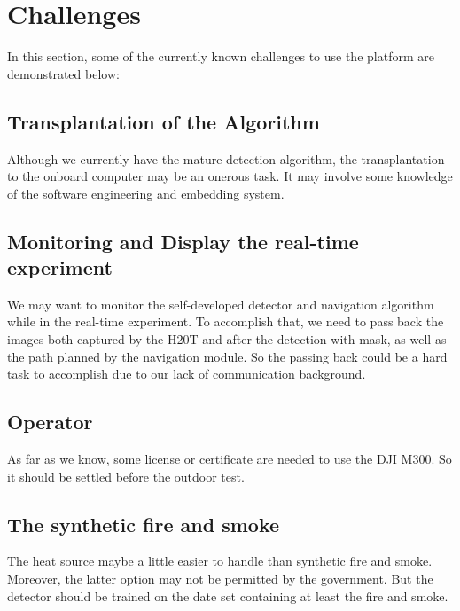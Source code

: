 \documentclass{report}
\begin{document}
\chapter{Challenges}
 In this section, some of the currently known challenges to use the platform are
 demonstrated below:

\section{Transplantation of the Algorithm }
Although we currently have the mature detection algorithm, the transplantation
to the onboard computer may be an onerous task. It may involve some knowledge of
the software engineering and embedding system.

\section{Monitoring and Display the real-time experiment}
We may want to monitor the self-developed detector and navigation algorithm
while in the real-time experiment. To accomplish that, we need to pass back the
images both captured by the H20T and after the detection with mask, as well as
the path planned by the navigation module. So the passing back could be a hard
task to accomplish due to our lack of communication background.

\section{Operator}
As far as we know, some license or certificate  are needed to use the DJI M300.
So it should be settled before the outdoor test.

\section{The synthetic fire and smoke}
The heat source maybe a little easier to handle than synthetic fire and smoke.
Moreover, the latter option may not be permitted by the government. But the
detector should be trained on the date set containing at least the fire and
smoke.
\end{document}
